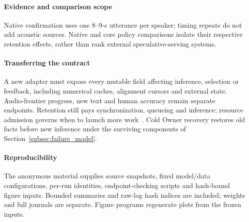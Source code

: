 \paragraph{Evidence and comparison scope}
Native confirmation uses one 8--9-s utterance per speaker; timing repeats
do not add acoustic sources. Native and core policy comparisons isolate
their respective retention effects, rather than rank external
speculative-serving systems.

\paragraph{Transferring the contract}
A new adapter must expose every mutable field affecting inference,
selection or feedback, including numerical caches, alignment cursors and
external state. Audio-frontier progress, new text and human accuracy
remain separate endpoints. Retention still pays synchronization,
queueing and inference; resource admission governs when to launch more
work~\cite{welsh2001seda}. Cold Owner recovery restores old facts before
new inference under the surviving components of
Section~\ref{subsec:failure_model}.

\paragraph{Reproducibility}
The anonymous material supplies source snapshots, fixed model/data
configurations, per-run identities, endpoint-checking scripts and
hash-bound figure inputs. Bounded summaries and raw-log hash indices are
included; weights and full journals are separate. Figure programs
regenerate plots from the frozen inputs.
